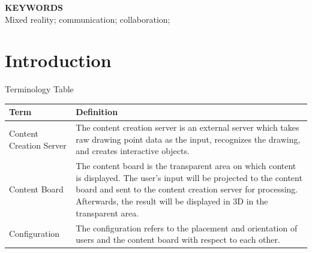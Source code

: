 \documentclass[sigchi-a]{acmart}
\begin{document}

\begin{margintable}
\vspace{1cm}
\flushleft
\textbf{KEYWORDS}\\
Mixed reality; communication; collaboration;
\end{margintable}

\maketitle





\section{Introduction}
\begin{margintable}
    \caption{Terminology Table}
    \label{tab:table1}
    \begin{tabular}{p{1.6cm} p{3.81cm}}
      \textbf{Term} &  \textbf{Definition}
      \\
      \toprule
      Content Creation Server & The content creation server is an external server which takes raw drawing point data as the input, recognizes the drawing, and creates interactive objects. \\
      Content Board & The content board is the transparent area on which content is displayed.
      The user's input will be projected to the content board and sent to the content creation server for processing. Afterwards, the result will be displayed in 3D in the transparent area.
      \\
      Configuration & The configuration refers to the placement and orientation of users and the content board with respect to each other. \\
      \bottomrule
    \end{tabular}
\end{margintable}
\end{document}
